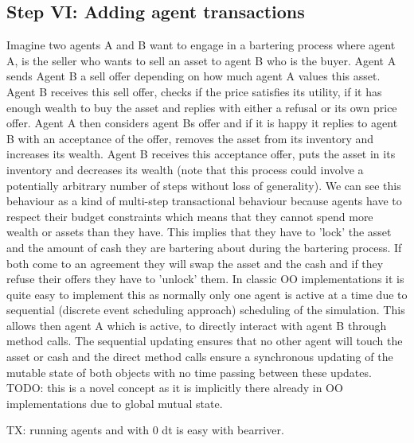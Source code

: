 \subsection{Step VI: Adding agent transactions}
Imagine two agents A and B want to engage in a bartering process where agent A, is the seller who wants to sell an asset to agent B who is the buyer. Agent A sends Agent B a sell offer depending on how much agent A values this asset. Agent B receives this sell offer, checks if the price satisfies its utility, if it has enough wealth to buy the asset and replies with either a refusal or its own price offer. Agent A then considers agent Bs offer and if it is happy it replies to agent B with an acceptance of the offer, removes the asset from its inventory and increases its wealth. Agent B receives this acceptance offer, puts the asset in its inventory and decreases its wealth (note that this process could involve a potentially arbitrary number of steps without loss of generality).
We can see this behaviour as a kind of multi-step transactional behaviour because agents have to respect their budget constraints which means that they cannot spend more wealth or assets than they have. This implies that they have to 'lock' the asset and the amount of cash they are bartering about during the bartering process. If both come to an agreement they will swap the asset and the cash and if they refuse their offers they have to 'unlock' them.
In classic OO implementations it is quite easy to implement this as normally only one agent is active at a time due to sequential (discrete event scheduling approach) scheduling of the simulation. This allows then agent A which is active, to directly interact with agent B through method calls. The sequential updating ensures that no other agent will touch the asset or cash and the direct method calls ensure a synchronous updating of the mutable state of both objects with no time passing between these updates.
TODO: this is a novel concept as it is implicitly there already in OO implementations due to global mutual state.

TX: running agents and with 0 dt is easy with bearriver.